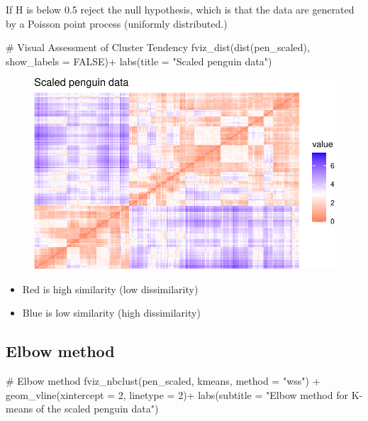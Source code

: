 \documentclass[
  letterpaper,
  DIV=11,
  numbers=noendperiod]{scrreprt}
\newenvironment{Shaded}{\begin{snugshade}}{\end{snugshade}}
\newcommand{\AttributeTok}[1]{\textcolor[rgb]{0.40,0.45,0.13}{#1}}
\newcommand{\CommentTok}[1]{\textcolor[rgb]{0.37,0.37,0.37}{#1}}
\newcommand{\ConstantTok}[1]{\textcolor[rgb]{0.56,0.35,0.01}{#1}}
\newcommand{\DecValTok}[1]{\textcolor[rgb]{0.68,0.00,0.00}{#1}}
\newcommand{\FunctionTok}[1]{\textcolor[rgb]{0.28,0.35,0.67}{#1}}
\newcommand{\NormalTok}[1]{\textcolor[rgb]{0.00,0.23,0.31}{#1}}
\newcommand{\SpecialCharTok}[1]{\textcolor[rgb]{0.37,0.37,0.37}{#1}}
\newcommand{\StringTok}[1]{\textcolor[rgb]{0.13,0.47,0.30}{#1}}
\providecommand{\tightlist}{%
  \setlength{\itemsep}{0pt}\setlength{\parskip}{0pt}}\usepackage{longtable,booktabs,array}
\begin{document}
If H is below 0.5 reject the null hypothesis, which is that the data are
generated by a Poisson point process (uniformly distributed.)

\begin{Shaded}
\begin{Highlighting}[]
\CommentTok{\# Visual Assessment of Cluster Tendency}
\FunctionTok{fviz\_dist}\NormalTok{(}\FunctionTok{dist}\NormalTok{(pen\_scaled), }\AttributeTok{show\_labels =} \ConstantTok{FALSE}\NormalTok{)}\SpecialCharTok{+} \FunctionTok{labs}\NormalTok{(}\AttributeTok{title =} \StringTok{"Scaled penguin data"}\NormalTok{)}
\end{Highlighting}
\end{Shaded}

\begin{figure}[H]

{\centering \includegraphics{./12-clustering_files/figure-pdf/unnamed-chunk-12-1.pdf}

}

\end{figure}

\begin{itemize}
\tightlist
\item
  Red is high similarity (low dissimilarity)
\item
  Blue is low similarity (high dissimilarity)
\end{itemize}

\hypertarget{elbow-method}{%
\subsection{Elbow method}\label{elbow-method}}

\begin{Shaded}
\begin{Highlighting}[]
\CommentTok{\# Elbow method}
\FunctionTok{fviz\_nbclust}\NormalTok{(pen\_scaled, kmeans, }\AttributeTok{method =} \StringTok{"wss"}\NormalTok{) }\SpecialCharTok{+} \FunctionTok{geom\_vline}\NormalTok{(}\AttributeTok{xintercept =} \DecValTok{2}\NormalTok{, }\AttributeTok{linetype =} \DecValTok{2}\NormalTok{)}\SpecialCharTok{+}
\FunctionTok{labs}\NormalTok{(}\AttributeTok{subtitle =} \StringTok{"Elbow method for K{-}means of the scaled penguin data"}\NormalTok{)}
\end{Highlighting}
\end{Shaded}
\end{document}
